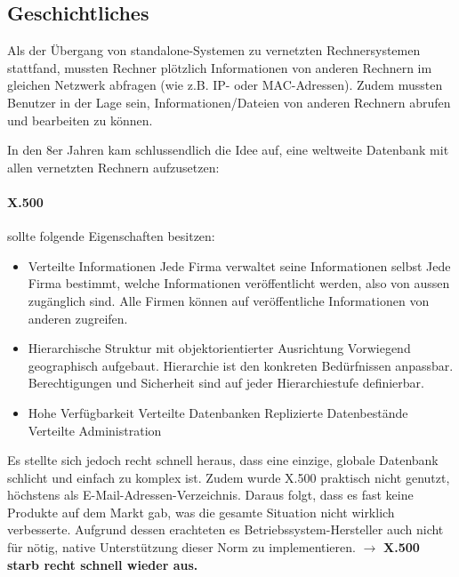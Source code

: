 \documentclass[a4paper, 11pt]{article}
\begin{document}
\subsection{Geschichtliches}
Als der Übergang von standalone-Systemen zu vernetzten Rechnersystemen stattfand, mussten Rechner plötzlich Informationen von anderen Rechnern im gleichen Netzwerk abfragen (wie z.B. IP- oder MAC-Adressen). Zudem mussten Benutzer in der Lage sein, Informationen/Dateien von anderen Rechnern abrufen und bearbeiten zu können. 

In den 8er Jahren kam schlussendlich die Idee auf, eine weltweite Datenbank mit allen vernetzten Rechnern aufzusetzen:

\paragraph{X.500} sollte folgende Eigenschaften besitzen:
\begin{itemize}
	\item Verteilte Informationen
		\subitem Jede Firma verwaltet seine Informationen selbst
		\subitem Jede Firma bestimmt, welche Informationen veröffentlicht werden, also von aussen zugänglich sind.
		\subitem Alle Firmen können auf veröffentliche Informationen von anderen zugreifen.
	\item Hierarchische Struktur mit objektorientierter Ausrichtung
		\subitem Vorwiegend geographisch aufgebaut.
		\subitem Hierarchie ist den konkreten Bedürfnissen anpassbar.
		\subitem Berechtigungen und Sicherheit sind auf jeder Hierarchiestufe definierbar.
	\item Hohe Verfügbarkeit
		\subitem Verteilte Datenbanken 
		\subitem Replizierte Datenbestände
		\subitem Verteilte Administration
\end{itemize}

Es stellte sich jedoch recht schnell heraus, dass eine einzige, globale Datenbank schlicht und einfach zu komplex ist. Zudem wurde X.500 praktisch nicht genutzt, höchstens als E-Mail-Adressen-Verzeichnis. Daraus folgt, dass es fast keine Produkte auf dem Markt gab, was die gesamte Situation nicht wirklich verbesserte. Aufgrund dessen erachteten es Betriebssystem-Hersteller auch nicht für nötig, native Unterstützung dieser Norm zu implementieren. $\rightarrow$ \textbf{X.500 starb recht schnell wieder aus.}

\newpage
\end{document}
